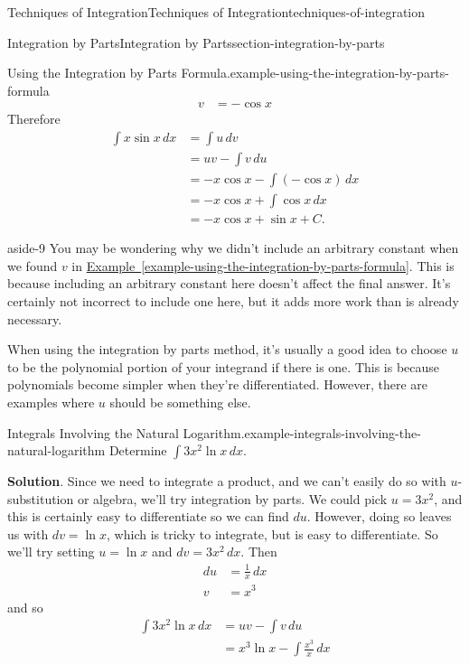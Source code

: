 \documentclass[oneside,10pt,]{book}
\numberwithin{equation}{section}
\begin{document}
\begin{chapterptx}{Techniques of Integration}{}{Techniques of Integration}{}{}{techniques-of-integration}
\begin{sectionptx}{Integration by Parts}{}{Integration by Parts}{}{}{section-integration-by-parts}
\begin{example}{Using the Integration by Parts Formula.}{example-using-the-integration-by-parts-formula}
\begin{align*}
v & = -\cos x 
\end{align*}
\hypertarget{p-503}{}%
Therefore%
%
\begin{align*}
\int x\sin x\,dx & = \int u\,dv \\
& = uv - \int v\,du \\
& = -x\cos x - \int (-\cos x)\,dx \\
& = -x\cos x + \int\cos x\,dx \\
& = -x\cos x + \sin x + C. 
\end{align*}
\end{example}
\begin{aside}{}{aside-9}%
\hypertarget{p-504}{}%
You may be wondering why we didn't include an arbitrary constant when we found \(v\) in \hyperref[example-using-the-integration-by-parts-formula]{Example~\ref{example-using-the-integration-by-parts-formula}}. This is because including an arbitrary constant here doesn't affect the final answer. It's certainly not incorrect to include one here, but it adds more work than is already necessary.%
\end{aside}
\hypertarget{p-505}{}%
When using the integration by parts method, it's usually a good idea to choose \(u\) to be the polynomial portion of your integrand if there is one. This is because polynomials become simpler when they're differentiated. However, there are examples where \(u\) should be something else.%
\begin{example}{Integrals Involving the Natural Logarithm.}{example-integrals-involving-the-natural-logarithm}%
\hypertarget{p-506}{}%
Determine \(\int 3x^{2}\ln x\,dx\).%
\par\smallskip%
\noindent\textbf{Solution}.\hypertarget{solution-111}{}\quad%
\hypertarget{p-507}{}%
Since we need to integrate a product, and we can't easily do so with \(u\)-substitution or algebra, we'll try integration by parts. We could pick \(u = 3x^{2}\), and this is certainly easy to differentiate so we can find \(du\). However, doing so leaves us with \(dv = \ln x\), which is tricky to integrate, but is easy to differentiate. So we'll try setting \(u = \ln x\) and \(dv = 3x^{2}\,dx\). Then%
%
\begin{align*}
du & = \frac{1}{x}\,dx \\
v & = x^{3} 
\end{align*}
\hypertarget{p-508}{}%
and so%
%
\begin{align*}
\int 3x^{2}\ln x\,dx & = uv - \int v\,du \\
& = x^{3}\ln x - \int \frac{x^{3}}{x}\,dx \\

\end{align*}
\end{example}
\end{sectionptx}
\end{chapterptx}
\end{document}
